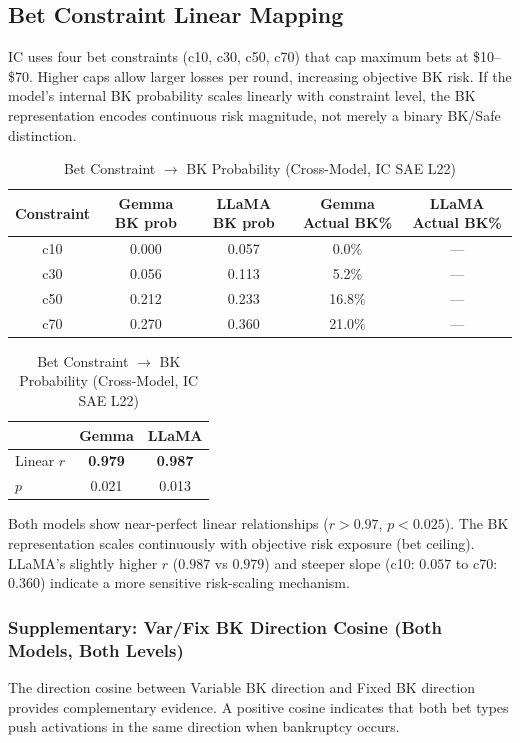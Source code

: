 \documentclass[11pt,a4paper]{article}
\begin{document}
\subsection{Bet Constraint Linear Mapping}

IC uses four bet constraints (c10, c30, c50, c70) that cap maximum bets at \$10--\$70. Higher caps allow larger losses per round, increasing objective BK risk. If the model's internal BK probability scales linearly with constraint level, the BK representation encodes continuous risk magnitude, not merely a binary BK/Safe distinction.

\begin{table}[H]
\centering
\caption{Bet Constraint $\rightarrow$ BK Probability (Cross-Model, IC SAE L22)}\label{tab:t17}
\footnotesize
\begin{tabular}{ccccc}
\toprule
Constraint & Gemma BK prob & LLaMA BK prob & Gemma Actual BK\% & LLaMA Actual BK\% \\
\midrule
c10 & 0.000 & 0.057 & 0.0\% & --- \\
c30 & 0.056 & 0.113 & 5.2\% & --- \\
c50 & 0.212 & 0.233 & 16.8\% & --- \\
c70 & 0.270 & 0.360 & 21.0\% & --- \\
\bottomrule
\end{tabular}

\medskip
\begin{tabular}{lcc}
\toprule
 & Gemma & LLaMA \\
\midrule
Linear $r$ & \textbf{0.979} & \textbf{0.987} \\
$p$ & 0.021 & 0.013 \\
\bottomrule
\end{tabular}
\end{table}

\noindent Both models show near-perfect linear relationships ($r > 0.97$, $p < 0.025$). The BK representation scales continuously with objective risk exposure (bet ceiling). LLaMA's slightly higher $r$ ($0.987$ vs $0.979$) and steeper slope (c10: $0.057$ to c70: $0.360$) indicate a more sensitive risk-scaling mechanism.

\subsubsection*{Supplementary: Var/Fix BK Direction Cosine (Both Models, Both Levels)}

The direction cosine between Variable BK direction and Fixed BK direction provides complementary evidence. A positive cosine indicates that both bet types push activations in the same direction when bankruptcy occurs.
\end{document}
